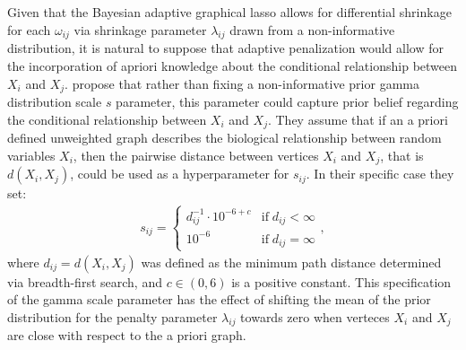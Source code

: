 Given that the Bayesian adaptive graphical lasso allows for differential shrinkage for each $\omega_{ij}$ via shrinkage parameter $\lambda_{ij}$ drawn from a non-informative distribution, it is natural to suppose that adaptive penalization would allow for the incorporation of apriori knowledge about the conditional relationship between $X_i$ and $X_j$. \cite{peterson2013} propose that rather than fixing a non-informative prior gamma distribution scale $s$ parameter, this parameter could capture prior belief regarding the conditional relationship between $X_i$ and $X_j$. They assume that if an a priori defined unweighted graph describes the biological relationship between random variables $X_i$, then  the pairwise distance between vertices $X_i$ and $X_j$, that is $d(X_i,X_j)$, could be used as a hyperparameter for $s_{ij}$. In their specific case they set:
\begin{align}
s_{ij}=
\begin{cases} 
d_{ij}^{-1} \cdot  10^{-6+c} & \text{if} \; d_{ij}<\infty \\
10^{-6} & \text{if} \; d_{ij}=\infty
\end{cases},
\end{align}
where $d_{ij}=d(X_i,X_j)$ was defined as the minimum path distance determined via breadth-first search, and $c\in (0,6)$ is a positive constant. This specification of the gamma scale parameter has the effect of shifting the mean of the prior distribution for the penalty parameter $\lambda_{ij}$ towards zero when verteces $X_i$ and $X_j$ are close with respect to the a priori graph.

